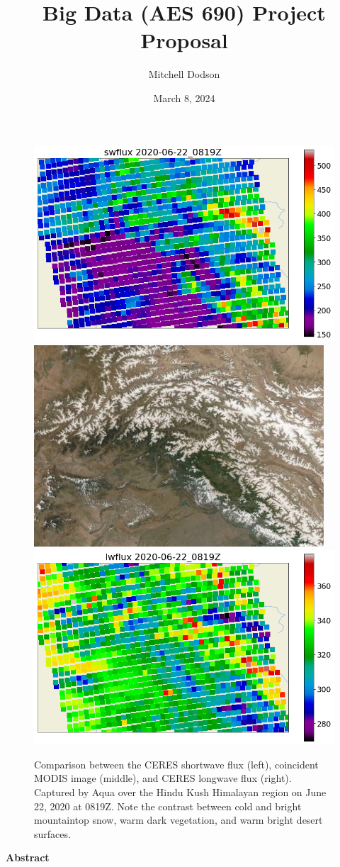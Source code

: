 \documentclass[11pt]{article}
\title{Big Data (AES 690) Project Proposal}
\author{Mitchell Dodson}
\date{March 8, 2024}
\begin{document}
\maketitle

\newpage

\begin{figure}[h!]
    \centering

    \includegraphics[width=.33\linewidth]{figs/geo_scatter_2020-06-22_0819Z_swflux.png}
    \includegraphics[width=.31\linewidth]{figs/20200622_0819_hkh_modis.png}
    \includegraphics[width=.33\linewidth]{figs/geo_scatter_2020-06-22_0819Z_lwflux.png}

    \caption{Comparison between the CERES shortwave flux (left), coincident MODIS image (middle), and CERES longwave flux (right). Captured by Aqua over the Hindu Kush Himalayan region on June 22, 2020 at 0819Z. Note the contrast between cold and bright mountaintop snow, warm dark vegetation, and warm bright desert surfaces.}
    \label{ceres_modis_compare}
\end{figure}

\noindent
{\large\textbf{Abstract}}
\end{document}
